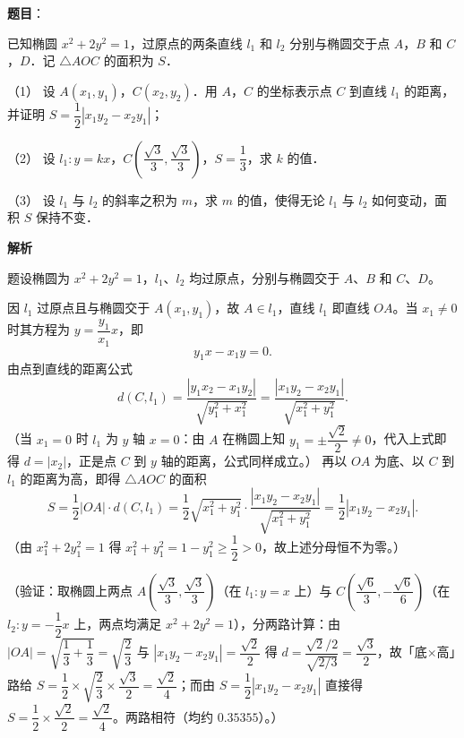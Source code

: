 \begin{answer}

\textbf{题目}：

已知椭圆 \(x^{2}+2y^{2}=1\)，过原点的两条直线 \(l_{1}\) 和 \(l_{2}\) 分别与椭圆交于点 \(A\)，\(B\) 和 \(C\)，\(D\)．记 \(\triangle AOC\) 的面积为 \(S\)．

（1） 设 \(A(x_{1},y_{1})\)，\(C(x_{2},y_{2})\)．用 \(A\)，\(C\) 的坐标表示点 \(C\) 到直线 \(l_{1}\) 的距离，并证明 \(S=\dfrac{1}{2}|x_{1}y_{2}-x_{2}y_{1}|\)；

（2） 设 \(l_{1}:y=kx\)，\(C\left(\dfrac{\sqrt{3}}{3},\dfrac{\sqrt{3}}{3}\right)\)，\(S=\dfrac{1}{3}\)，求 \(k\) 的值．

（3） 设 \(l_{1}\) 与 \(l_{2}\) 的斜率之积为 \(m\)，求 \(m\) 的值，使得无论 \(l_{1}\) 与 \(l_{2}\) 如何变动，面积 \(S\) 保持不变．

\textbf{解析}

题设椭圆为 \(x^{2}+2y^{2}=1\)，\(l_{1}\)、\(l_{2}\) 均过原点，分别与椭圆交于 \(A\)、\(B\) 和 \(C\)、\(D\)。


因 \(l_{1}\) 过原点且与椭圆交于 \(A(x_{1},y_{1})\)，故 \(A\in l_{1}\)，直线 \(l_{1}\) 即直线 \(OA\)。当 \(x_{1}\neq0\) 时其方程为 \(y=\dfrac{y_{1}}{x_{1}}x\)，即
\nopagebreak[4]
\[
y_{1}x-x_{1}y=0.
\]
由点到直线的距离公式
\nopagebreak[4]
\[
d(C,l_{1})=\frac{|y_{1}x_{2}-x_{1}y_{2}|}{\sqrt{y_{1}^{2}+x_{1}^{2}}}=\frac{|x_{1}y_{2}-x_{2}y_{1}|}{\sqrt{x_{1}^{2}+y_{1}^{2}}}.
\]
（当 \(x_{1}=0\) 时 \(l_{1}\) 为 \(y\) 轴 \(x=0\)：由 \(A\) 在椭圆上知 \(y_{1}=\pm\dfrac{\sqrt2}{2}\neq0\)，代入上式即得 \(d=|x_{2}|\)，正是点 \(C\) 到 \(y\) 轴的距离，公式同样成立。）
再以 \(OA\) 为底、以 \(C\) 到 \(l_{1}\) 的距离为高，即得 \(\triangle AOC\) 的面积
\nopagebreak[4]
\[
S=\frac{1}{2}|OA|\cdot d(C,l_{1})=\frac{1}{2}\sqrt{x_{1}^{2}+y_{1}^{2}}\cdot\frac{|x_{1}y_{2}-x_{2}y_{1}|}{\sqrt{x_{1}^{2}+y_{1}^{2}}}=\frac{1}{2}|x_{1}y_{2}-x_{2}y_{1}|.
\]
（由 \(x_{1}^{2}+2y_{1}^{2}=1\) 得 \(x_{1}^{2}+y_{1}^{2}=1-y_{1}^{2}\geqslant\dfrac{1}{2}>0\)，故上述分母恒不为零。）

（验证：取椭圆上两点 \(A\left(\dfrac{\sqrt3}{3},\dfrac{\sqrt3}{3}\right)\)（在 \(l_{1}:y=x\) 上）与 \(C\left(\dfrac{\sqrt6}{3},-\dfrac{\sqrt6}{6}\right)\)（在 \(l_{2}:y=-\dfrac{1}{2}x\) 上，两点均满足 \(x^{2}+2y^{2}=1\)），分两路计算：由 \(|OA|=\sqrt{\dfrac{1}{3}+\dfrac{1}{3}}=\sqrt{\dfrac{2}{3}}\) 与 \(|x_{1}y_{2}-x_{2}y_{1}|=\dfrac{\sqrt2}{2}\) 得 \(d=\dfrac{\sqrt2/2}{\sqrt{2/3}}=\dfrac{\sqrt3}{2}\)，故「底×高」路给 \(S=\dfrac{1}{2}\times\sqrt{\dfrac{2}{3}}\times\dfrac{\sqrt3}{2}=\dfrac{\sqrt2}{4}\)；而由 \(S=\dfrac{1}{2}|x_{1}y_{2}-x_{2}y_{1}|\) 直接得 \(S=\dfrac{1}{2}\times\dfrac{\sqrt2}{2}=\dfrac{\sqrt2}{4}\)。两路相符（均约 \(0.35355\)）。）


\end{answer}
